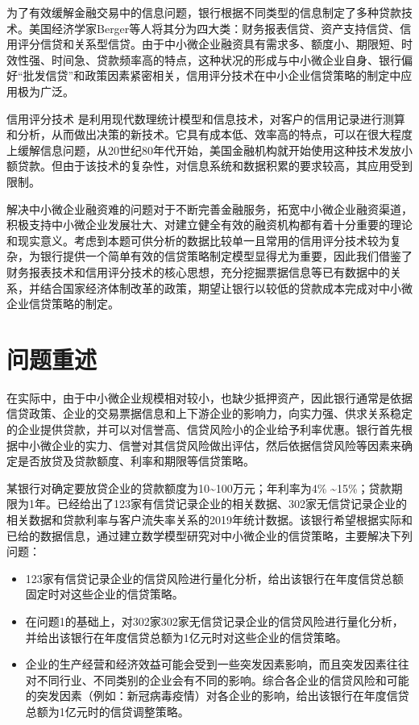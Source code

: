 \documentclass{cumcmthesis}
\begin{document}
为了有效缓解金融交易中的信息问题，银行根据不同类型的信息制定了多种贷款技术。美国经济学家Berger等人将其分为四大类：财务报表信贷、资产支持信贷、信用评分信贷和关系型信贷。由于中小微企业融资具有需求多、额度小、期限短、时效性强、时间急、贷款频率高的特点，这种状况的形成与中小微企业自身、银行偏好“批发信贷”和政策因素紧密相关，信用评分技术在中小企业信贷策略的制定中应用极为广泛。 \cite{ref1}

信用评分技术\cite{ref2}	是利用现代数理统计模型和信息技术，对客户的信用记录进行测算和分析，从而做出决策的新技术。它具有成本低、效率高的特点，可以在很大程度上缓解信息问题，从20世纪80年代开始，美国金融机构就开始使用这种技术发放小额贷款。但由于该技术的复杂性，对信息系统和数据积累的要求较高，其应用受到限制。	

解决中小微企业融资难的问题对于不断完善金融服务，拓宽中小微企业融资渠道，积极支持中小微企业发展壮大、对建立健全有效的融资机构都有着十分重要的理论和现实意义。考虑到本题可供分析的数据比较单一且常用的信用评分技术较为复杂，为银行提供一个简单有效的信贷策略制定模型显得尤为重要，因此我们借鉴了财务报表技术和信用评分技术的核心思想，充分挖掘票据信息等已有数据中的关系，并结合国家经济体制改革的政策，期望让银行以较低的贷款成本完成对中小微企业信贷策略的制定。



\section{问题重述}

在实际中，由于中小微企业规模相对较小，也缺少抵押资产，因此银行通常是依据信贷政策\cite{ref4}、企业的交易票据信息和上下游企业的影响力，向实力强、供求关系稳定的企业提供贷款，并可以对信誉高、信贷风险小的企业给予利率优惠。银行首先根据中小微企业的实力、信誉对其信贷风险做出评估，然后依据信贷风险等因素来确定是否放贷及贷款额度、利率和期限等信贷策略。

某银行对确定要放贷企业的贷款额度为10\textasciitilde 100万元；年利率为4\% \textasciitilde 15\%；贷款期限为1年。已经给出了123家有信贷记录企业的相关数据、302家无信贷记录企业的相关数据和贷款利率与客户流失率关系的2019年统计数据。该银行希望根据实际和已给的数据信息，通过建立数学模型研究对中小微企业的信贷策略，主要解决下列问题：
\begin{itemize}
    \item 123家有信贷记录企业的信贷风险进行量化分析，给出该银行在年度信贷总额固定时对这些企业的信贷策略。
    \item 在问题1的基础上，对302家302家无信贷记录企业的信贷风险进行量化分析，并给出该银行在年度信贷总额为1亿元时对这些企业的信贷策略。
    \item 企业的生产经营和经济效益可能会受到一些突发因素影响，而且突发因素往往对不同行业、不同类别的企业会有不同的影响。综合各企业的信贷风险和可能的突发因素（例如：新冠病毒疫情）对各企业的影响，给出该银行在年度信贷总额为1亿元时的信贷调整策略。
\end{itemize}
\end{document}
